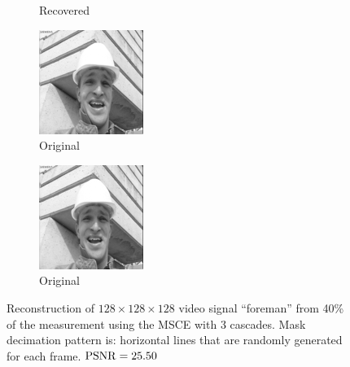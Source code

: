 \begin{figure}
\begin{subfigure}{0.4\textwidth}
    \caption{Recovered}
  \end{subfigure}
  \begin{subfigure}{0.4\textwidth}
    \centering
    \includegraphics[width=.9\textwidth]{Chapter7/Images/foreman40_orig_18.png}
    \caption{Original}
  \end{subfigure}
  \begin{subfigure}{0.4\textwidth}
    \centering
    \includegraphics[width=.9\textwidth]{Chapter7/Images/foreman40_orig_22.png}
    \caption{Original}
  \end{subfigure}
  \caption{Reconstruction of $128\times 128\times 128$ video signal ``foreman'' from 40\% of the measurement using the MSCE with 3 cascades. Mask decimation pattern is: horizontal lines that are randomly generated for each frame. $\operatorname*{PSNR} = 25.50$}
\end{figure}


